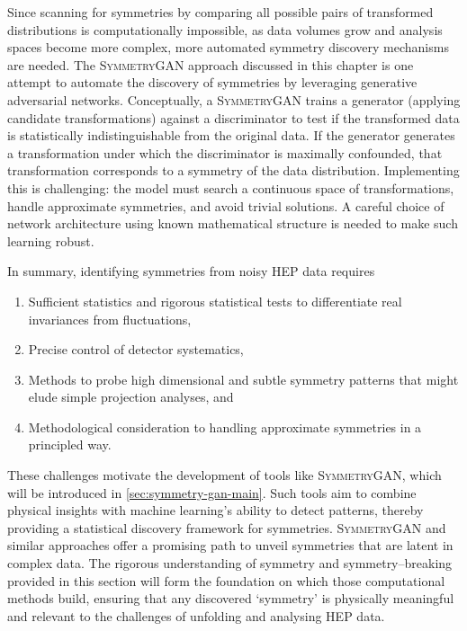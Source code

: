             Since scanning for symmetries by comparing all possible pairs of transformed distributions is computationally impossible, as data volumes grow and analysis spaces become more complex, more automated symmetry discovery mechanisms are needed.
            The \textsc{SymmetryGAN} approach discussed in this chapter is one attempt to automate the discovery of symmetries by leveraging generative adversarial networks.
            Conceptually, a \textsc{SymmetryGAN} trains a generator (applying candidate transformations) against a discriminator to test if the transformed data is statistically indistinguishable from the original data.
            If the generator generates a transformation under which the discriminator is maximally confounded, that transformation corresponds to a symmetry of the data distribution.
            Implementing this is challenging: the model must search a continuous space of transformations, handle approximate symmetries, and avoid trivial solutions.
            A careful choice of network architecture using known mathematical structure is needed to make such learning robust.

            In summary, identifying symmetries from noisy HEP data requires
            \begin{enumerate}
                \item Sufficient statistics and rigorous statistical tests to differentiate real invariances from fluctuations,
                \item Precise control of detector systematics,
                \item Methods to probe high dimensional and subtle symmetry patterns that might elude simple projection analyses, and
                \item Methodological consideration to handling approximate symmetries in a principled way.
            \end{enumerate}
            These challenges motivate the development of tools like \textsc{SymmetryGAN}, which will be introduced in \cref{sec:symmetry-gan-main}.
            Such tools aim to combine physical insights with machine learning's ability to detect patterns, thereby providing a statistical discovery framework for symmetries.
            \textsc{SymmetryGAN} and similar approaches offer a promising path to unveil symmetries that are latent in complex data.
            The rigorous understanding of symmetry and symmetry--breaking provided in this section will form the foundation on which those computational methods build, ensuring that any discovered `symmetry' is physically meaningful and relevant to the challenges of unfolding and analysing HEP data.

